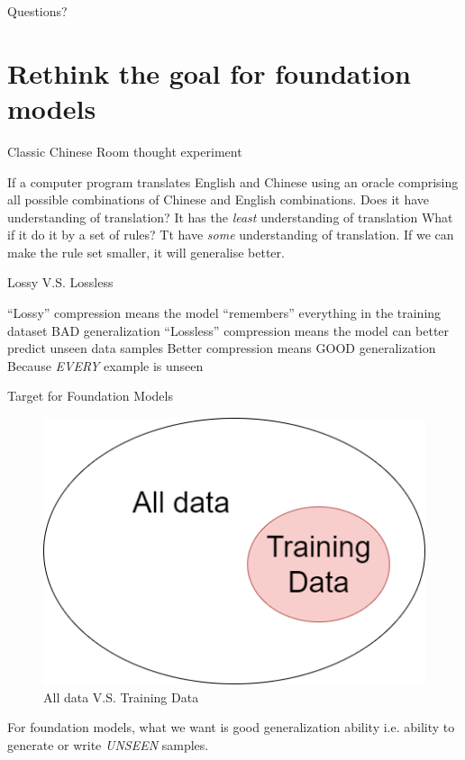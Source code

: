 \documentclass[scheme=plain]{ctexbeamer}
\begin{document}
\begin{frame}[standout]
  Questions?
\end{frame}

\section[LLM, compression and AGI]{Rethink the goal for foundation models}

\begin{frame}{Classic Chinese Room thought experiment}
  \begin{outline}
    \1 If a computer program translates English and Chinese using an oracle comprising all possible combinations of Chinese and English combinations.
      \2 Does it have understanding of translation?
    \pause
      \2 It has the \emph{least} understanding of translation
    \pause
    \1 What if it do it by a set of rules?
      \2 Tt have \emph{some} understanding of translation.
    \pause
    \1 If we can make the rule set smaller, it will generalise better.
  \end{outline}
\end{frame}

\begin{frame}{Lossy V.S. Lossless}
  \begin{outline}
    \1 ``Lossy'' compression means the model ``remembers'' everything in the training dataset
      \2 BAD generalization
    \1 ``Lossless'' compression means the model can better predict unseen data samples
      \2 Better compression means GOOD generalization
        \3 Because \emph{EVERY} example is unseen
  \end{outline}
\end{frame}

\begin{frame}{Target for Foundation Models}
  \begin{figure}
    \includegraphics[width=.6\linewidth]{target_for_foundation_models.drawio.png}
    \caption{All data V.S. Training Data}
  \end{figure}
  \begin{outline}
    \1 For foundation models, what we want is good generalization ability
      \2 i.e. ability to generate or write \emph{UNSEEN} samples.
  \end{outline}
\end{frame}
\end{document}
